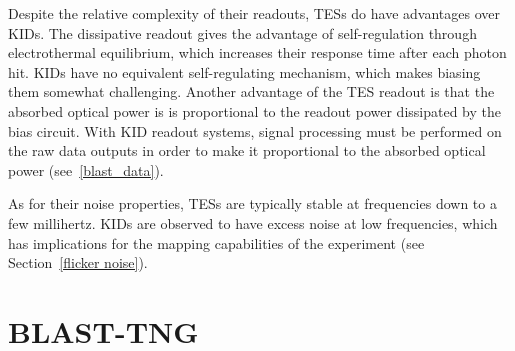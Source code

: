 Despite the relative complexity of their readouts, TESs do have advantages over KIDs. The dissipative readout gives the advantage of self-regulation through electrothermal equilibrium, which increases their response time after each photon hit. KIDs have no equivalent self-regulating mechanism, which makes biasing them somewhat challenging. Another advantage of the TES readout is that the absorbed optical power is is proportional to the readout power dissipated by the bias circuit. With KID readout systems, signal processing must be performed on the raw data outputs in order to make it proportional to the absorbed optical power (see~\ref{blast_data}).

As for their noise properties, TESs are typically stable at frequencies down to a few millihertz. KIDs are observed to have excess noise at low frequencies, which has implications for the mapping capabilities of the experiment (see Section~\ref{flicker noise}).

\section{BLAST-TNG}\label{blast}

